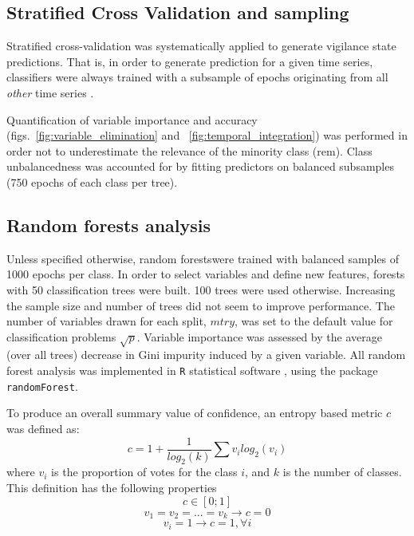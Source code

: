 \subsection{Stratified Cross Validation and sampling}


Stratified cross-validation was systematically applied to generate vigilance state predictions.
That is, in order to generate prediction for a given time series, classifiers were always trained with a subsample of epochs
originating from all \emph{other} time series \cite{ding_querying_2008}.

Quantification of variable importance and accuracy (figs.~\ref{fig:variable_elimination} and ~\ref{fig:temporal_integration}) was performed in order 
not to underestimate the relevance of the minority class (\gls{rem}).
Class  unbalancedness was accounted for by fitting predictors on balanced subsamples (750 epochs of each class per tree).


\subsection{Random forests analysis}
Unless specified otherwise, random forests\cite{breiman_random_2001}were trained
with balanced samples of 1000 epochs per class.
In order to select variables and define new features, forests with 50 classification trees were built.
100 trees were used otherwise.
Increasing the sample size and number of trees did not seem to improve performance.
The number of variables drawn for each split, $mtry$, was set to the default value for classification problems $\sqrt{p}$.
Variable importance was assessed by the average (over all trees) decrease in Gini impurity induced by a given variable.
All random forest analysis was implemented in \texttt{R} statistical software
\cite{r_core_team_r:_2014}, using the package
\texttt{randomForest}\cite{liaw_classification_2002}.

To produce an overall summary value of confidence, an entropy based metric $c$ was defined as:
\begin{equation}
c = 1 + \frac{1}{log_2(k)}\sum{v_i  log_2(v_i)}
\label{eq:entropy}
\end{equation}
where $v_i$ is the proportion of votes for the class $i$, and $k$ is the number of classes. 
This definition has the following properties 
\[
c \in [0;1]
\]
\[
v_1 = v_2 = ... = v_k \rightarrow c = 0
\]
\[
v_i = 1 \rightarrow c = 1 , \forall i
\]





